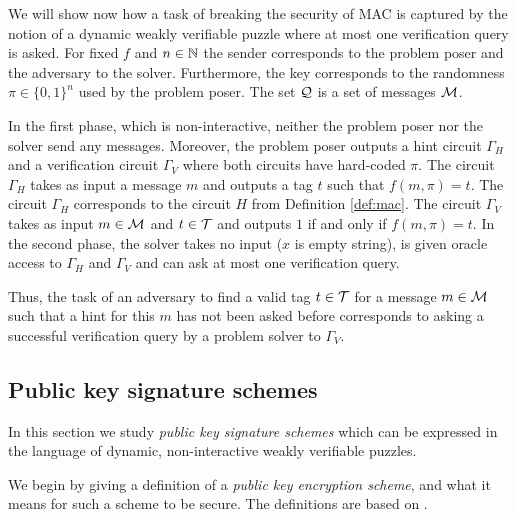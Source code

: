 We will show now how a task of breaking the security of MAC is captured by the notion of a dynamic weakly verifiable puzzle where at most one verification query is asked.
For fixed $f$ and $n \in \mathbb{N}$ the sender corresponds to the problem poser and the adversary to the solver.
Furthermore, the key corresponds to the randomness $\pi \in \{0,1\}^{n}$ used by the problem poser.
The set $\mathcal{Q}$ is a set of messages $\mathcal{M}$.

In the first phase, which is non-interactive, neither the problem poser nor the solver send any messages.
Moreover, the problem poser outputs a hint circuit $\Gamma_H$ and a verification circuit $\Gamma_V$ where both circuits have hard-coded $\pi$.
The circuit $\Gamma_H$ takes as input a message $m$ and outputs a tag $t$ such that $f(m, \pi) = t$.
The circuit $\Gamma_H$ corresponds to the circuit $H$ from Definition \ref{def:mac}.
The circuit $\Gamma_V$ takes as input $m \in \mathcal{M}$ and $t \in \mathcal{T}$ and outputs $1$ if and only if $f(m, \pi) = t$.
In the second phase, the solver takes no input ($x$ is empty string), is given oracle access to $\Gamma_H$ and $\Gamma_V$ and
can ask at most one verification query.

Thus, the task of an adversary to find a valid tag $t \in \mathcal{T}$ for a message $m \in \mathcal{M}$ such that a hint for this $m$ has not been asked before
corresponds to asking a successful verification query by a problem solver to $\Gamma_V$.
%
\subsection{Public key signature schemes}
In this section we study \textit{public key signature schemes} which can be expressed in the language of dynamic,
non-interactive weakly verifiable puzzles.

We begin by giving a definition of a \textit{public key encryption scheme}, and what it means for such a scheme to be secure.
The definitions are based on \cite{Goldreich:2004:FCV:975541}.

